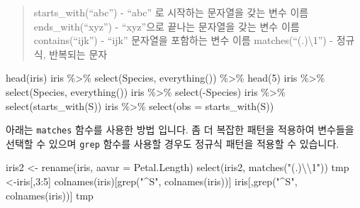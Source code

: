\documentclass[
]{book}
\newenvironment{Shaded}{\begin{snugshade}}{\end{snugshade}}
\newcommand{\AttributeTok}[1]{\textcolor[rgb]{0.77,0.63,0.00}{#1}}
\newcommand{\DecValTok}[1]{\textcolor[rgb]{0.00,0.00,0.81}{#1}}
\newcommand{\FunctionTok}[1]{\textcolor[rgb]{0.00,0.00,0.00}{#1}}
\newcommand{\NormalTok}[1]{#1}
\newcommand{\OtherTok}[1]{\textcolor[rgb]{0.56,0.35,0.01}{#1}}
\newcommand{\SpecialCharTok}[1]{\textcolor[rgb]{0.00,0.00,0.00}{#1}}
\newcommand{\StringTok}[1]{\textcolor[rgb]{0.31,0.60,0.02}{#1}}
\begin{document}
\begin{quote}
starts\_with(``abc'') - ``abc'' 로 시작하는 문자열을 갖는 변수 이름
ends\_with(``xyz'') - ``xyz''으로 끝나는 문자열을 갖는 변수 이름
contains(``ijk'') - ``ijk'' 문자열을 포함하는 변수 이름
matches(``(.)\textbackslash1'') - 정규식, 반복되는 문자
\end{quote}

\begin{Shaded}
\begin{Highlighting}[]
\FunctionTok{head}\NormalTok{(iris)}
\NormalTok{iris }\SpecialCharTok{\%\textgreater{}\%} \FunctionTok{select}\NormalTok{(Species, }\FunctionTok{everything}\NormalTok{()) }\SpecialCharTok{\%\textgreater{}\%} \FunctionTok{head}\NormalTok{(}\DecValTok{5}\NormalTok{)}
\NormalTok{iris }\SpecialCharTok{\%\textgreater{}\%} \FunctionTok{select}\NormalTok{(Species, }\FunctionTok{everything}\NormalTok{())}
\NormalTok{iris }\SpecialCharTok{\%\textgreater{}\%} \FunctionTok{select}\NormalTok{(}\SpecialCharTok{{-}}\NormalTok{Species)}
\NormalTok{iris }\SpecialCharTok{\%\textgreater{}\%} \FunctionTok{select}\NormalTok{(}\FunctionTok{starts\_with}\NormalTok{(}\StringTok{\textquotesingle{}S\textquotesingle{}}\NormalTok{))}
\NormalTok{iris }\SpecialCharTok{\%\textgreater{}\%} \FunctionTok{select}\NormalTok{(}\AttributeTok{obs =} \FunctionTok{starts\_with}\NormalTok{(}\StringTok{\textquotesingle{}S\textquotesingle{}}\NormalTok{))}
\end{Highlighting}
\end{Shaded}

아래는 \texttt{matches} 함수를 사용한 방법 입니다. 좀 더 복잡한 패턴을 적용하여 변수들을 선택할 수 있으며 \texttt{grep} 함수를 사용할 경우도 정규식 패턴을 적용할 수 있습니다.

\begin{Shaded}
\begin{Highlighting}[]
\NormalTok{iris2 }\OtherTok{\textless{}{-}} \FunctionTok{rename}\NormalTok{(iris, }\AttributeTok{aavar =}\NormalTok{ Petal.Length)}
\FunctionTok{select}\NormalTok{(iris2, }\FunctionTok{matches}\NormalTok{(}\StringTok{"(.)}\SpecialCharTok{\textbackslash{}\textbackslash{}}\StringTok{1"}\NormalTok{))}
\NormalTok{tmp }\OtherTok{\textless{}{-}}\NormalTok{iris[,}\DecValTok{3}\SpecialCharTok{:}\DecValTok{5}\NormalTok{]}
\FunctionTok{colnames}\NormalTok{(iris)[}\FunctionTok{grep}\NormalTok{(}\StringTok{"\^{}S"}\NormalTok{, }\FunctionTok{colnames}\NormalTok{(iris))]}
\NormalTok{iris[,}\FunctionTok{grep}\NormalTok{(}\StringTok{"\^{}S"}\NormalTok{, }\FunctionTok{colnames}\NormalTok{(iris))]}
\NormalTok{tmp}
\end{Highlighting}
\end{Shaded}
\end{document}
